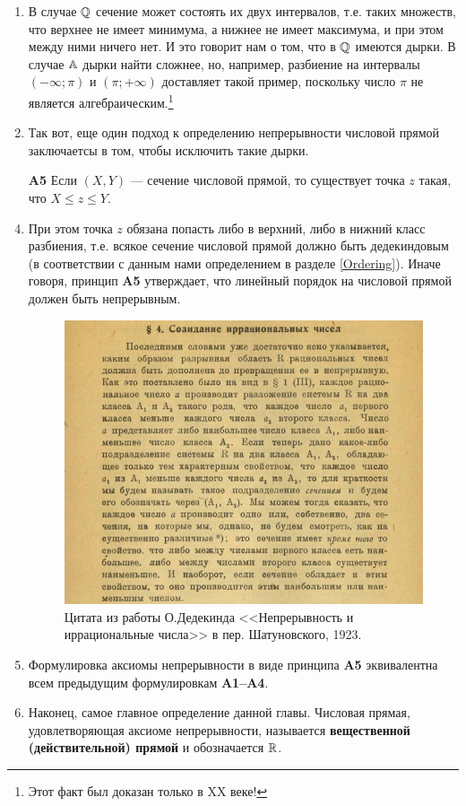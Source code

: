 \begin{enumerate}
\item В случае $\mathbb Q$ сечение может состоять их двух интервалов, т.е. таких множеств, что верхнее не имеет минимума, а нижнее не имеет максимума, и при этом между ними ничего нет. И это говорит нам о том, что в $\mathbb Q$ имеются дырки. В случае $\mathbb A$ дырки найти сложнее, но, например, разбиение на интервалы $(-\infty;\pi)$ и $(\pi;+\infty)$ доставляет такой пример, поскольку число $\pi$ не является алгебраическим.\footnote{Этот факт был доказан только в XX веке!}
\item Так вот, еще один подход к определению непрерывности числовой прямой заключаетсы в том, чтобы исключить такие дырки.
\item[\bf A5] Если $(X,Y)$ --- сечение числовой прямой, то существует точка $z$ такая, что $X\le z\le Y$.
\item При этом точка $z$ обязана попасть либо в верхний, либо в нижний класс разбиения, т.е. всякое сечение числовой прямой должно быть дедекиндовым (в соответствии с данным нами определением в разделе \ref{Ordering}). Иначе говоря, принцип \textbf{A5} утверждает, что линейный порядок на числовой прямой должен быть непрерывным.
\begin{figure}
\begin{center}
\includegraphics[scale=0.6]{dedekind.png}
\caption{Цитата из работы О.Дедекинда <<Непрерывность и иррациональные числа>> в пер. Шатуновского, 1923.}
\end{center}
\end{figure}
\item Формулировка аксиомы непрерывности в виде принципа \textbf{A5} эквивалентна всем предыдущим формулировкам \textbf{A1--A4}.
\item Наконец, самое главное определение данной главы. Числовая прямая, удовлетворяющая аксиоме непрерывности, называется \textbf{вещественной (действительной) прямой} и обозначается $\mathbb R$.


\end{enumerate}
